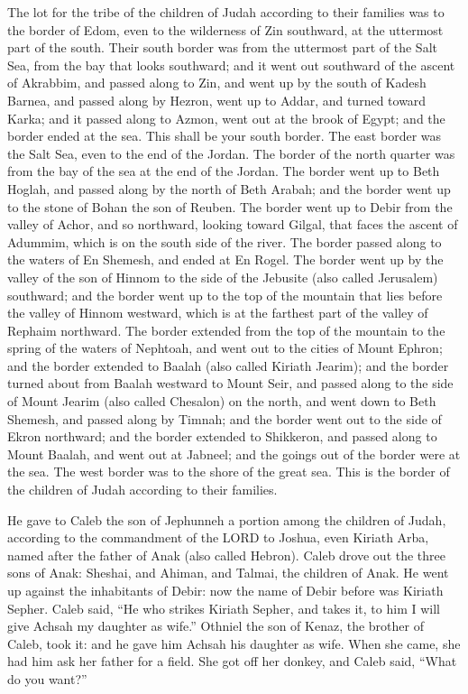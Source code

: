 \mychapter{} \myverse*{}The lot for the tribe of the children of Judah according to their
families was to the border of Edom, even to the wilderness of Zin southward, at the uttermost part of
the south.
\myverse{}Their south border was from the uttermost part of the Salt Sea, from the bay
that looks southward;
\myverse{}and it went out southward of the ascent of Akrabbim, and passed along to Zin,
and went up by the south of Kadesh Barnea, and passed along by Hezron, went up to Addar, and turned toward
Karka;
\myverse{}and it passed along to Azmon, went out at the brook of Egypt; and the border
ended at the sea. This shall be your south border.
\myverse{}The east border was the Salt Sea, even to the end of the Jordan. The border
of the north quarter was from the bay of the sea at the end of the Jordan.
\myverse{}The border went up to Beth Hoglah, and passed along by the north of Beth Arabah;
and the border went up to the stone of Bohan the son of Reuben.
\myverse{}The border went up to Debir from the valley of Achor, and so northward, looking
toward Gilgal, that faces the ascent of Adummim, which is on the south side of the river. The border passed
along to the waters of En Shemesh, and ended at En Rogel.
\myverse{}The border went up by the valley of the son of Hinnom to the side of the Jebusite
(also called Jerusalem) southward; and the border went up to the top of the mountain that lies before
the valley of Hinnom westward, which is at the farthest part of the valley of Rephaim northward.
\myverse{}The border extended from the top of the mountain to the spring of the waters
of Nephtoah, and went out to the cities of Mount Ephron; and the border extended to Baalah (also called
Kiriath Jearim);
\myverse{}and the border turned about from Baalah westward to Mount Seir, and passed
along to the side of Mount Jearim (also called Chesalon) on the north, and went down to Beth Shemesh,
and passed along by Timnah;
\myverse{}and the border went out to the side of Ekron northward; and the border extended
to Shikkeron, and passed along to Mount Baalah, and went out at Jabneel; and the goings out of the border
were at the sea.
\myverse{}The west border was to the shore of the great sea. This is the border of
the children of Judah according to their families.

\myverse{}He gave to Caleb the son of Jephunneh a portion among the children
of Judah, according to the commandment of the LORD to Joshua, even Kiriath Arba, named after the father
of Anak (also called Hebron).
\myverse{}Caleb drove out the three sons of Anak: Sheshai, and Ahiman, and Talmai,
the children of Anak.
\myverse{}He went up against the inhabitants of Debir: now the name of Debir before
was Kiriath Sepher.
\myverse{}Caleb said, “He who strikes Kiriath Sepher, and takes it, to him I will give
Achsah my daughter as wife.”
\myverse{}Othniel the son of Kenaz, the brother of Caleb, took it: and he gave him
Achsah his daughter as wife.
\myverse{}When she came, she had him ask her father for a field. She got off her donkey,
and Caleb said, “What do you want?”

